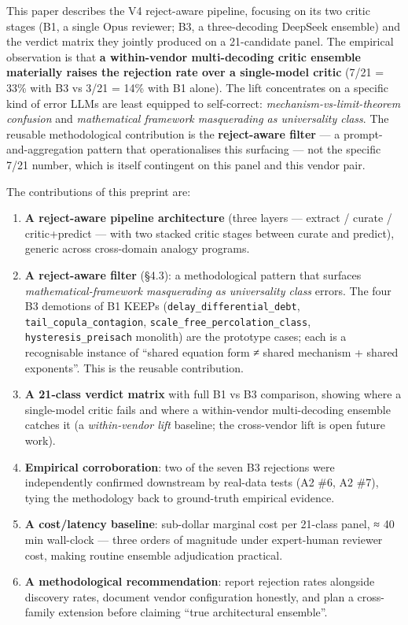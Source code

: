 \documentclass[
  letterpaper,
  11pt]{article}
\providecommand{\tightlist}{%
  \setlength{\itemsep}{0pt}\setlength{\parskip}{0pt}}
\begin{document}
This paper describes the V4 reject-aware pipeline, focusing on its two
critic stages (B1, a single Opus reviewer; B3, a three-decoding DeepSeek
ensemble) and the verdict matrix they jointly produced on a 21-candidate
panel. The empirical observation is that \textbf{a within-vendor
multi-decoding critic ensemble materially raises the rejection rate over
a single-model critic} (7/21 = 33\% with B3 vs 3/21 = 14\% with B1
alone). The lift concentrates on a specific kind of error LLMs are least
equipped to self-correct: \emph{mechanism-vs-limit-theorem confusion}
and \emph{mathematical framework masquerading as universality class}.
The reusable methodological contribution is the \textbf{reject-aware
filter} --- a prompt-and-aggregation pattern that operationalises this
surfacing --- not the specific 7/21 number, which is itself contingent
on this panel and this vendor pair.

The contributions of this preprint are:

\begin{enumerate}
\def\labelenumi{\arabic{enumi}.}
\tightlist
\item
  \textbf{A reject-aware pipeline architecture} (three layers ---
  extract / curate / critic+predict --- with two stacked critic stages
  between curate and predict), generic across cross-domain analogy
  programs.
\item
  \textbf{A reject-aware filter} (§4.3): a methodological pattern that
  surfaces \emph{mathematical-framework masquerading as universality
  class} errors. The four B3 demotions of B1 KEEPs
  (\texttt{delay\_differential\_debt}, \texttt{tail\_copula\_contagion},
  \texttt{scale\_free\_percolation\_class},
  \texttt{hysteresis\_preisach} monolith) are the prototype cases; each
  is a recognisable instance of ``shared equation form ≠ shared
  mechanism + shared exponents''. This is the reusable contribution.
\item
  \textbf{A 21-class verdict matrix} with full B1 vs B3 comparison,
  showing where a single-model critic fails and where a within-vendor
  multi-decoding ensemble catches it (a \emph{within-vendor lift}
  baseline; the cross-vendor lift is open future work).
\item
  \textbf{Empirical corroboration}: two of the seven B3 rejections were
  independently confirmed downstream by real-data tests (A2 \#6, A2
  \#7), tying the methodology back to ground-truth empirical evidence.
\item
  \textbf{A cost/latency baseline}: sub-dollar marginal cost per
  21-class panel, ≈ 40 min wall-clock --- three orders of magnitude
  under expert-human reviewer cost, making routine ensemble adjudication
  practical.
\item
  \textbf{A methodological recommendation}: report rejection rates
  alongside discovery rates, document vendor configuration honestly, and
  plan a cross-family extension before claiming ``true architectural
  ensemble''.
\end{enumerate}
\end{document}
